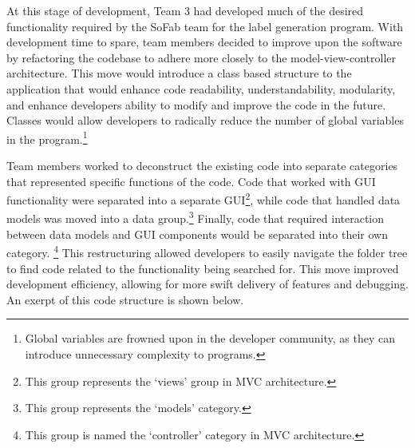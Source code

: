 \documentclass{article}
\begin{document}
At this stage of development, Team 3 had developed much of the desired functionality required by the SoFab team for the label generation
program. With development time to spare, team members decided to improve upon the software by refactoring the codebase to adhere more 
closely to the model-view-controller architecture. This move would introduce a class based structure to the application that would 
enhance code readability, understandability, modularity, and enhance developers ability to modify and improve the code in the future.
Classes would allow developers to radically reduce the number of global variables in the program.\footnote{Global variables are 
frowned upon in the developer community, as they can introduce unnecessary complexity to programs.}

Team members worked to deconstruct the existing code into separate categories that represented specific functions of the code. Code 
that worked with GUI functionality were separated into a separate GUI\footnote{This group represents the `views' group in MVC architecture.},
while code that handled data models was moved into a data group.\footnote{This group represents the `models' category.} Finally,
code that required interaction between data models and GUI components would be separated into their own category. \footnote{This
group is named the `controller' category in MVC architecture.} This restructuring allowed developers to easily navigate the folder tree
to find code related to the functionality being searched for. This move improved development efficiency, allowing for more swift 
delivery of features and debugging. An exerpt of this code structure is shown below. 
\end{document}
